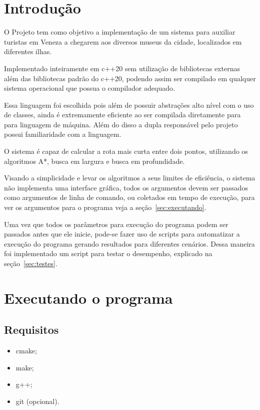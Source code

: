 \documentclass[12pt, a4paper]{article}
\begin{document}
\capa%
\tableofcontents%
\listoffigures%
\listoftables\cleardoublepage%

\section{Introdução}\label{sec:intro}
O Projeto tem como objetivo a implementação de um sistema para auxiliar turistas em Veneza a chegarem aos diversos museus da cidade,
localizados em diferentes ilhas.

Implementado inteiramente em c++20 sem utilização de bibliotecas externas além das bibliotecas padrão do c++20,
podendo assim ser compilado em qualquer sistema operacional que possua o compilador adequado.

Essa linguagem foi escolhida pois além de possuir abstrações alto nível com o uso de classes,
ainda é extremamente eficiente ao ser compilada diretamente para para linguagem de máquina.
Além do disso a dupla responsável pelo projeto possui familiaridade com a linguagem.

O sistema é capaz de calcular a rota mais curta entre dois pontos,
utilizando os algoritmos A*, busca em largura e busca em profundidade.

Visando a simplicidade e levar os algoritmos a seus limites de eficiência,
o sistema não implementa uma interface gráfica,
todos os argumentos devem ser passados como argumentos de linha de comando,
ou coletados em tempo de execução, para ver os argumentos para o programa veja a seção~\ref{sec:executando}.

Uma vez que todos os parâmetros para execução do programa podem ser passados antes que ele inicie,
pode-se fazer uso de scripts para automatizar a execução do programa gerando resultados para diferentes cenários.
Dessa maneira foi implementado um script para testar o desempenho, explicado na seção~\ref{sec:testes}.

\section{Executando o programa}\label{sec:executando_programa}
\subsection{Requisitos}\label{sec:requisitos}
\begin{itemize}
    \item cmake;
    \item make;
    \item g++;
    \item git (opcional).
\end{itemize}
\end{document}
